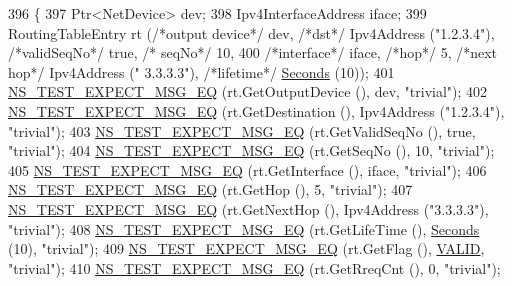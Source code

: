 \begin{DoxyCode}
396   \{
397     Ptr<NetDevice> dev;
398     Ipv4InterfaceAddress iface;
399     RoutingTableEntry rt (\textcolor{comment}{/*output device*/} dev, \textcolor{comment}{/*dst*/} Ipv4Address (\textcolor{stringliteral}{"1.2.3.4"}), \textcolor{comment}{/*validSeqNo*/} \textcolor{keyword}{true}, \textcolor{comment}{/*
      seqNo*/} 10,
400                                             \textcolor{comment}{/*interface*/} iface, \textcolor{comment}{/*hop*/} 5, \textcolor{comment}{/*next hop*/} Ipv4Address (\textcolor{stringliteral}{"
      3.3.3.3"}), \textcolor{comment}{/*lifetime*/} \hyperlink{group__timecivil_ga33c34b816f8ff6628e33d5c8e9713b9e}{Seconds} (10));
401     \hyperlink{group__testing_ga7304ba46a28d8cf08dfdfd6499cf7068}{NS\_TEST\_EXPECT\_MSG\_EQ} (rt.GetOutputDevice (), dev, \textcolor{stringliteral}{"trivial"});
402     \hyperlink{group__testing_ga7304ba46a28d8cf08dfdfd6499cf7068}{NS\_TEST\_EXPECT\_MSG\_EQ} (rt.GetDestination (), Ipv4Address (\textcolor{stringliteral}{"1.2.3.4"}), \textcolor{stringliteral}{"trivial"});
403     \hyperlink{group__testing_ga7304ba46a28d8cf08dfdfd6499cf7068}{NS\_TEST\_EXPECT\_MSG\_EQ} (rt.GetValidSeqNo (), \textcolor{keyword}{true}, \textcolor{stringliteral}{"trivial"});
404     \hyperlink{group__testing_ga7304ba46a28d8cf08dfdfd6499cf7068}{NS\_TEST\_EXPECT\_MSG\_EQ} (rt.GetSeqNo (), 10, \textcolor{stringliteral}{"trivial"});
405     \hyperlink{group__testing_ga7304ba46a28d8cf08dfdfd6499cf7068}{NS\_TEST\_EXPECT\_MSG\_EQ} (rt.GetInterface (), iface, \textcolor{stringliteral}{"trivial"});
406     \hyperlink{group__testing_ga7304ba46a28d8cf08dfdfd6499cf7068}{NS\_TEST\_EXPECT\_MSG\_EQ} (rt.GetHop (), 5, \textcolor{stringliteral}{"trivial"});
407     \hyperlink{group__testing_ga7304ba46a28d8cf08dfdfd6499cf7068}{NS\_TEST\_EXPECT\_MSG\_EQ} (rt.GetNextHop (), Ipv4Address (\textcolor{stringliteral}{"3.3.3.3"}), \textcolor{stringliteral}{"trivial"});
408     \hyperlink{group__testing_ga7304ba46a28d8cf08dfdfd6499cf7068}{NS\_TEST\_EXPECT\_MSG\_EQ} (rt.GetLifeTime (), \hyperlink{group__timecivil_ga33c34b816f8ff6628e33d5c8e9713b9e}{Seconds} (10), \textcolor{stringliteral}{"trivial"});
409     \hyperlink{group__testing_ga7304ba46a28d8cf08dfdfd6499cf7068}{NS\_TEST\_EXPECT\_MSG\_EQ} (rt.GetFlag (), \hyperlink{group__aodv_gga44216921a9c725a5ab8bc19059052a26af5fecee96bb2650aa417994840b43c99}{VALID}, \textcolor{stringliteral}{"trivial"});
410     \hyperlink{group__testing_ga7304ba46a28d8cf08dfdfd6499cf7068}{NS\_TEST\_EXPECT\_MSG\_EQ} (rt.GetRreqCnt (), 0, \textcolor{stringliteral}{"trivial"});

\end{DoxyCode}
